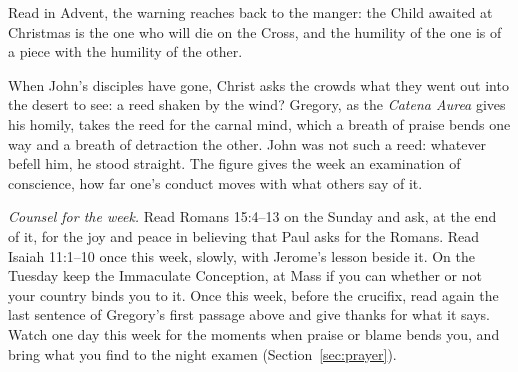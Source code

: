 Read in Advent, the warning reaches back to the manger: the Child awaited at Christmas is the one
who will die on the Cross, and the humility of the one is of a piece with the humility of the
other.

When John's disciples have gone, Christ asks the crowds what they went out into the desert to
see: a reed shaken by the wind? Gregory, as the \textit{Catena Aurea} gives his homily, takes
the reed for the carnal mind, which a breath of praise bends one way and a breath of detraction
the other. John was not such a reed: whatever befell him, he stood straight. The figure gives
the week an examination of conscience, how far one's conduct moves with what others say of it.

\medskip
\noindent\textit{Counsel for the week.} Read Romans 15:4--13 on the Sunday and ask, at the end of
it, for the joy and peace in believing that Paul asks for the Romans. Read Isaiah 11:1--10 once
this week, slowly, with Jerome's lesson beside it. On the Tuesday keep the Immaculate
Conception, at Mass if you can whether or not your country binds you to it. Once this week,
before the crucifix, read again the last sentence of Gregory's first passage above and give
thanks for what it says. Watch one day
this week for the moments when praise or blame bends you, and bring what you find to the night
examen (Section~\ref{sec:prayer}).
